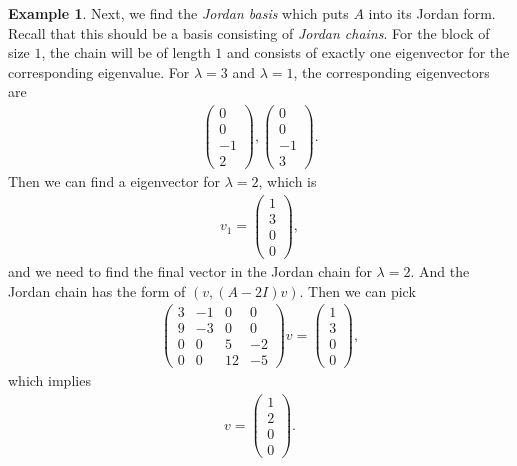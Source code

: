 \documentclass[11pt]{book}
\theoremstyle{definition}
\newtheorem{example}{Example}[chapter]
\numberwithin{equation}{chapter}
\begin{document}
\begin{example}
Next, we find the \emph{Jordan basis} which puts $A$ into its Jordan form. Recall that this should be a basis consisting of \emph{Jordan chains}. For the block of size $1$, the chain will be of length $1$ and consists of exactly one eigenvector for the corresponding eigenvalue. For $\lambda = 3$ and $\lambda = 1$, the corresponding eigenvectors are 
\begin{align*}
    \begin{pmatrix}
    0 \\
    0 \\
    -1 \\
    2
    \end{pmatrix}, \begin{pmatrix}
    0 \\
    0 \\
    -1 \\
    3
    \end{pmatrix}.
\end{align*}
Then we can find a eigenvector for $\lambda = 2$, which is 
\begin{align*}
    v_1 = \begin{pmatrix}
    1 \\
    3 \\
    0 \\
    0
    \end{pmatrix},
\end{align*}
and we need to find the final vector in the Jordan chain for $\lambda = 2$. And the Jordan chain has the form of $(v, (A-2I)v)$. Then we can pick 
\begin{align*}
    \begin{pmatrix}
    3 & -1 & 0 & 0 \\
    9 & -3 & 0 & 0 \\
    0 & 0 & 5 & -2 \\
    0 & 0 & 12 & -5
    \end{pmatrix} v = \begin{pmatrix}
    1 \\
    3 \\
    0 \\
    0
    \end{pmatrix},
\end{align*}
which implies 
\begin{align*}
    v = \begin{pmatrix}
    1 \\
    2 \\
    0 \\
    0
    \end{pmatrix}.

\end{align*}
\end{example}
\end{document}
